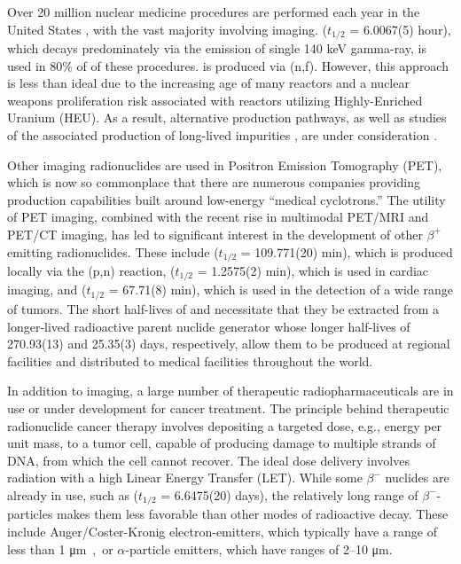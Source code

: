 \documentclass[letterpaper]{ar-1col}
\newcommand{\mmicro}{\si\micro}
\begin{document}
Over 20 million nuclear medicine procedures are performed each year in the United States \cite{Met09}, with the vast majority involving imaging.   ($t_{1/2}$ = 6.0067(5) hour), which decays predominately via the emission of single 140 keV gamma-ray, is used in 80\% of of these procedures.  is produced via (n,f).  However, this approach is less than ideal due to the increasing age of many reactors \cite{Qai12} and a nuclear weapons proliferation risk associated with reactors utilizing Highly-Enriched Uranium (HEU).  As a result, alternative  production pathways, as well as studies of the associated production of long-lived impurities \cite{Updegraff2013}, are under consideration \cite{Rut09}. 


Other imaging radionuclides are used in Positron Emission Tomography (PET), which is now so commonplace that
there are numerous companies   providing production capabilities built around low-energy \enquote{medical cyclotrons.} 
The utility of PET imaging, combined with the recent rise in multimodal PET/MRI and PET/CT imaging,  has
led to significant interest in the development of other $\beta^+$ emitting radionuclides.
These include  ($t_{1/2}$ = 109.771(20) min), which is produced locally via the (p,n) reaction,  ($t_{1/2}$ = 1.2575(2) min), which is used in cardiac imaging, and   ($t_{1/2}$ = 67.71(8) min), which is used in the detection of a wide range of tumors.  The short half-lives of  and  necessitate that they be extracted from a longer-lived radioactive parent nuclide generator whose longer half-lives of 270.93(13) and 25.35(3) days, respectively, allow them to be produced at regional facilities and distributed to medical facilities throughout the world.  

In addition to imaging, a large number of therapeutic radiopharmaceuticals are in use or under development for cancer treatment.  The principle behind therapeutic radionuclide cancer therapy involves depositing a targeted dose, e.g., energy per unit mass, to a tumor cell,  capable of producing damage to multiple strands of DNA, from which the cell cannot recover.  The ideal dose delivery involves radiation with a high Linear Energy Transfer (LET).  While some $\beta^-$ nuclides are already in use, such as  ($t_{1/2}$ = 6.6475(20) days), the relatively long range of $\beta^-$-particles makes them less favorable than other modes of radioactive decay.  These include Auger/Coster-Kronig electron-emitters, which typically have a range of less than 1 \mmicro m, or $\alpha$-particle emitters, which have ranges of 2--10 \mmicro m.  
\end{document}
